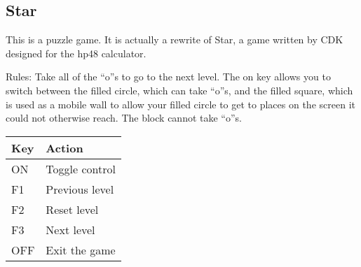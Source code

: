 \subsection{Star}

This is a puzzle game.  It is actually a rewrite of Star, a game written
by CDK designed for the hp48 calculator.

Rules: Take all of the ``o''s to go to the
next level.  The on key allows you to switch between the filled circle,
which can take ``o''s, and the filled square, which is used as a mobile
wall to allow your filled circle to get to places on the screen it
could not otherwise reach. The block cannot take ``o''s.

\begin{table}[h!]
\begin{center}
\begin{tabular}{@{}ll@{}}\toprule
\textbf{Key} & \textbf{Action} \\\midrule
ON & Toggle control \\
F1 & Previous level \\
F2 & Reset level \\
F3 & Next level \\
OFF & Exit the game \\\bottomrule
\end{tabular}
\end{center}
\end{table}
